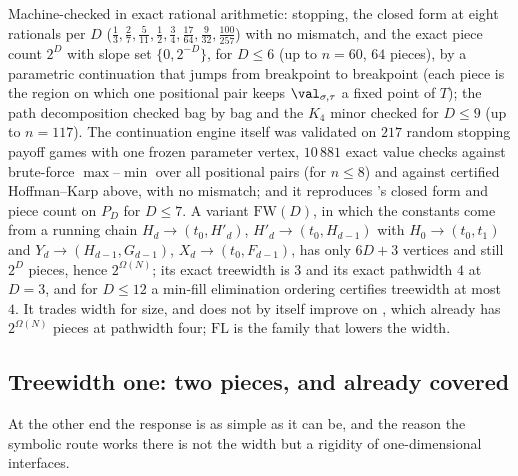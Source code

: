 \begin{remark}\label{wa:fold3-checked}
Machine-checked in exact rational arithmetic: stopping, the closed form at
eight rationals per $D$ ($\tfrac13,\tfrac27,\tfrac5{11},\tfrac12,\tfrac34,
\tfrac{17}{64},\tfrac9{32},\tfrac{100}{257}$) with no mismatch, and the exact
piece count $2^{D}$ with slope set $\{0,2^{-D}\}$, for $D\le6$ (up to $n=60$,
$64$ pieces), by a parametric continuation that jumps from breakpoint to
breakpoint (each piece is the region on which one positional pair keeps
$\val_{\sigma,\tau}$ a fixed point of $T$); the path decomposition checked bag
by bag and the $K_4$ minor checked for $D\le9$ (up to $n=117$). The continuation
engine itself was validated on $217$ random stopping payoff games with one
frozen parameter vertex, $10\,881$ exact value checks against brute-force
$\max$--$\min$ over all positional pairs (for $n\le8$) and against certified
Hoffman--Karp above, with no mismatch; and it reproduces 's
closed form and piece count on $P_D$ for $D\le7$. A variant
$\mathrm{FW}(D)$, in which the constants come from a running chain
$H_d\to(t_0,H'_d)$, $H'_d\to(t_0,H_{d-1})$ with $H_0\to(t_0,t_1)$ and
$Y_d\to(H_{d-1},G_{d-1})$, $X_d\to(t_0,F_{d-1})$, has only $6D+3$ vertices and
still $2^{D}$ pieces, hence $2^{\Omega(N)}$; its exact treewidth is $3$ and its
exact pathwidth $4$ at $D=3$, and for $D\le12$ a min-fill elimination ordering
certifies treewidth at most $4$. It trades width for size, and does not by
itself improve on , which already has $2^{\Omega(N)}$
pieces at pathwidth four; $\mathrm{FL}$ is the family that lowers the width.
\end{remark}

\subsection{Treewidth one: two pieces, and already covered}\label{wa:sec-forest}

At the other end the response is as simple as it can be, and the reason the
symbolic route works there is not the width but a rigidity of one-dimensional
interfaces.

